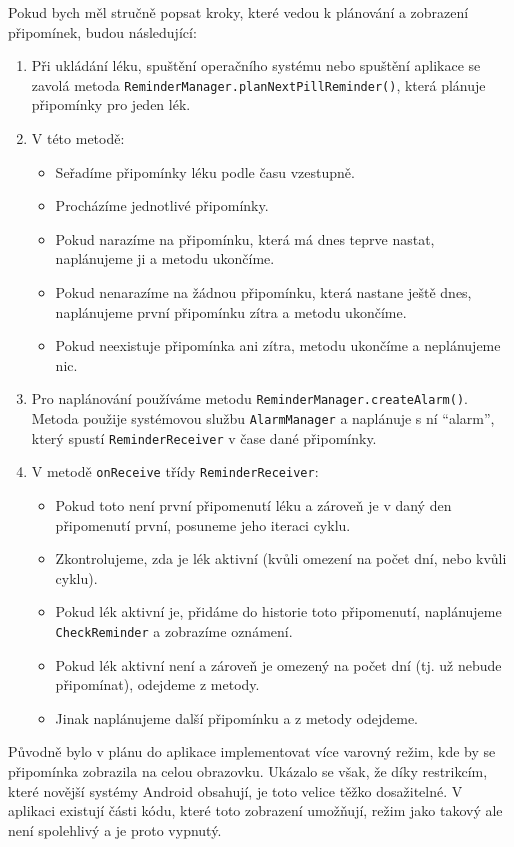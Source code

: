 \documentclass[../TakeYourPill.tex]{subfiles}
\begin{document}
Pokud bych měl stručně popsat kroky, které vedou k plánování a zobrazení připomínek, budou následující:

\begin{enumerate}
  \item Při ukládání léku, spuštění operačního systému nebo spuštění aplikace se zavolá metoda \texttt{ReminderManager.planNextPillReminder()}, která plánuje připomínky pro jeden lék.
  \item V této metodě:
  \begin{itemize}
    \item Seřadíme připomínky léku podle času vzestupně.
    \item Procházíme jednotlivé připomínky.
    \item Pokud narazíme na připomínku, která má dnes teprve nastat, naplánujeme ji a metodu ukončíme.
    \item Pokud nenarazíme na žádnou připomínku, která nastane ještě dnes, naplánujeme první připomínku zítra a metodu ukončíme.
    \item Pokud neexistuje připomínka ani zítra, metodu ukončíme a neplánujeme nic.
  \end{itemize}
  \item Pro naplánování používáme metodu \texttt{ReminderManager.createAlarm()}. Metoda použije systémovou službu \texttt{AlarmManager} a naplánuje s ní \enquote{alarm}, který spustí \texttt{ReminderReceiver} v čase dané připomínky.
  \item V metodě \texttt{onReceive} třídy \texttt{ReminderReceiver}:
  \begin{itemize}
    \item Pokud toto není první připomenutí léku a zároveň je v daný den připomenutí první, posuneme jeho iteraci cyklu.
    \item Zkontrolujeme, zda je lék aktivní (kvůli omezení na počet dní, nebo kvůli cyklu).
    \item Pokud lék aktivní je, přidáme do historie toto připomenutí, naplánujeme \texttt{CheckReminder} a zobrazíme oznámení.
    \item Pokud lék aktivní není a zároveň je omezený na počet dní (tj. už nebude připomínat), odejdeme z metody.
    \item Jinak naplánujeme další připomínku a z metody odejdeme.
  \end{itemize}
\end{enumerate}

Původně bylo v plánu do aplikace implementovat více varovný režim, kde by se připomínka zobrazila na celou obrazovku. Ukázalo se však, že díky restrikcím, které novější systémy Android obsahují, je toto velice těžko dosažitelné. V aplikaci existují části kódu, které toto zobrazení umožňují, režim jako takový ale není spolehlivý a je proto vypnutý.
\end{document}
